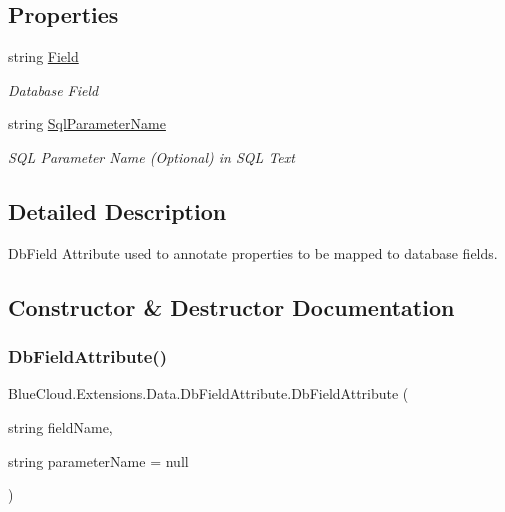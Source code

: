 \subsection*{Properties}
\begin{DoxyCompactItemize}
\item 
string \mbox{\hyperlink{class_blue_cloud_1_1_extensions_1_1_data_1_1_db_field_attribute_a146fcf50500222d224a12e27dd4c2285}{Field}}
\begin{DoxyCompactList}\small\item\em Database Field \end{DoxyCompactList}\item 
string \mbox{\hyperlink{class_blue_cloud_1_1_extensions_1_1_data_1_1_db_field_attribute_a87545da9d89ae282b3ade4616b960938}{Sql\+Parameter\+Name}}
\begin{DoxyCompactList}\small\item\em S\+QL Parameter Name (Optional) in S\+QL Text \end{DoxyCompactList}\end{DoxyCompactItemize}


\subsection{Detailed Description}
Db\+Field Attribute used to annotate properties to be mapped to database fields. 



\subsection{Constructor \& Destructor Documentation}
\mbox{\label{class_blue_cloud_1_1_extensions_1_1_data_1_1_db_field_attribute_a215a03bd00877393b57b061cbf6fdc85}} 
\subsubsection{\texorpdfstring{Db\+Field\+Attribute()}{DbFieldAttribute()}\hspace{0.1cm}{\footnotesize\ttfamily [1/2]}}
{\footnotesize\ttfamily Blue\+Cloud.\+Extensions.\+Data.\+Db\+Field\+Attribute.\+Db\+Field\+Attribute (\begin{DoxyParamCaption}\item[{string}]{field\+Name,  }\item[{string}]{parameter\+Name = {\ttfamily null} }\end{DoxyParamCaption})\hspace{0.3cm}{\ttfamily [inline]}}



